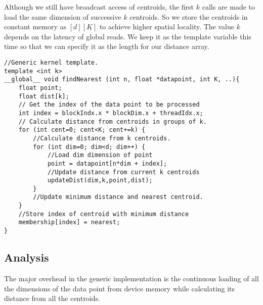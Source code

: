 Although we still have broadcast access of centroids, the first $k$ calls are made to load the same dimension of successive $k$ centroids. So we store the centroids in constant memory as $[d][K]$ to achieve higher spatial locality.
The value $k$ depends on the latency of global reads. We keep it as the template variable this time so that we can specify it as the length for our distance array.

\begin{lstlisting}[morekeywords={dist}]
//Generic kernel template.
template <int k>
__global__ void findNearest (int n, float *datapoint, int K, ..){
	float point;
	float dist[k];
	// Get the index of the data point to be processed
	int index = blockIndx.x * blockDim.x + threadIdx.x;
	// Calculate distance from centroids in groups of k.
	for (int cent=0; cent<K; cent+=k) {
		//Calculate distance from k centroids.
		for (int dim=0; dim<d; dim++) {
			//Load dim dimension of point
			point = datapoint[n*dim + index];
			//Update distance from current k centroids
			updateDist(dim,k,point,dist);
		}
		//Update minimum distance and nearest centroid.
	}
	//Store index of centroid with minimum distance	
	membership[index] = nearest;
}
\end{lstlisting}
\subsection{Analysis}
The major overhead in the generic implementation is the continuous loading of all the dimensions of the data point from device memory while calculating its distance from all the centroids. 

